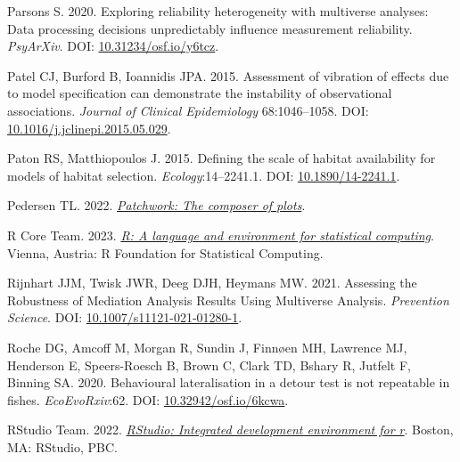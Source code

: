\documentclass[10pt,a4paper]{article}
\newlength{\cslhangindent}
\newlength{\cslentryspacingunit} %
\newenvironment{CSLReferences}[2] %
 {%
  \setlength{\parindent}{0pt}
  \ifodd #1
  \let\oldpar\par
  \def\par{\hangindent=\cslhangindent\oldpar}
  \fi
  \setlength{\parskip}{#2\cslentryspacingunit}
 }%
 {}
\begin{document}
\begin{CSLReferences}{1}{0}
\leavevmode{}%
Parsons S. 2020. Exploring reliability heterogeneity with multiverse analyses: {Data} processing decisions unpredictably influence measurement reliability. \emph{PsyArXiv}. DOI: \href{https://doi.org/10.31234/osf.io/y6tcz}{10.31234/osf.io/y6tcz}.

\leavevmode{}%
Patel CJ, Burford B, Ioannidis JPA. 2015. Assessment of vibration of effects due to model specification can demonstrate the instability of observational associations. \emph{Journal of Clinical Epidemiology} 68:1046--1058. DOI: \href{https://doi.org/10.1016/j.jclinepi.2015.05.029}{10.1016/j.jclinepi.2015.05.029}.

\leavevmode{}%
Paton RS, Matthiopoulos J. 2015. Defining the scale of habitat availability for models of habitat selection. \emph{Ecology}:14--2241.1. DOI: \href{https://doi.org/10.1890/14-2241.1}{10.1890/14-2241.1}.

\leavevmode{}%
Pedersen TL. 2022. \emph{\href{https://CRAN.R-project.org/package=patchwork}{Patchwork: The composer of plots}}.

\leavevmode{}%
R Core Team. 2023. \emph{\href{https://www.R-project.org/}{R: A language and environment for statistical computing}}. Vienna, Austria: R Foundation for Statistical Computing.

\leavevmode{}%
Rijnhart JJM, Twisk JWR, Deeg DJH, Heymans MW. 2021. Assessing the {Robustness} of {Mediation} {Analysis} {Results} {Using} {Multiverse} {Analysis}. \emph{Prevention Science}. DOI: \href{https://doi.org/10.1007/s11121-021-01280-1}{10.1007/s11121-021-01280-1}.

\leavevmode{}%
Roche DG, Amcoff M, Morgan R, Sundin J, Finnøen MH, Lawrence MJ, Henderson E, Speers-Roesch B, Brown C, Clark TD, Bshary R, Jutfelt F, Binning SA. 2020. Behavioural lateralisation in a detour test is not repeatable in fishes. \emph{EcoEvoRxiv}:62. DOI: \href{https://doi.org/10.32942/osf.io/6kcwa}{10.32942/osf.io/6kcwa}.

\leavevmode{}%
RStudio Team. 2022. \emph{\href{http://www.rstudio.com/}{{RStudio}: Integrated development environment for r}}. Boston, MA: RStudio, PBC.


\end{CSLReferences}
\end{document}
